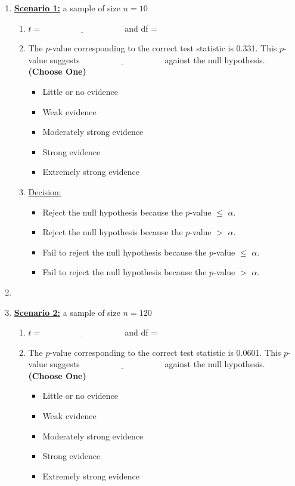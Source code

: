 \begin{enumerate}
\begin{enumerate}
\item \textbf{\underline{Scenario 1:}} a sample of size $n = 10$\\
\begin{enumerate}
\vspace{0.25cm}
\item $t = \underline{\hspace{4cm}}$ and df = \underline{\hspace{4cm}}
\item The $p$-value corresponding to the correct test statistic is 0.331. This $p$-value suggests $\underline{\hspace{4cm}}$ against the null hypothesis. \textbf{(Choose One)}
\begin{itemize}
\item Little or no evidence
\item Weak evidence
\item Moderately strong evidence
\item Strong evidence
\item Extremely strong evidence
\end{itemize}

\item \underline{Decision:}
\begin{itemize}
\item Reject the null hypothesis because the $p$-value $\leq$ $\alpha$.
\item Reject the null hypothesis because the $p$-value $>$ $\alpha$.
\item Fail to reject the null hypothesis because the $p$-value $\leq$ $\alpha$.
\item Fail to reject the null hypothesis because the $p$-value $>$ $\alpha$.
\end{itemize}
\end{enumerate}
\item[]
\item \textbf{\underline{Scenario 2:}} a sample of size $n = 120$\\
\begin{enumerate}
\vspace{0.25cm}
\item $t = \underline{\hspace{4cm}}$  and df = \underline{\hspace{4cm}}
\item The $p$-value corresponding to the correct test statistic is 0.0601. This $p$-value suggests $\underline{\hspace{4cm}}$ against the null hypothesis. \textbf{(Choose One)}
\begin{itemize}
\item Little or no evidence
\item Weak evidence
\item Moderately strong evidence
\item Strong evidence
\item Extremely strong evidence
\end{itemize}


\end{enumerate}
\end{enumerate}
\end{enumerate}
